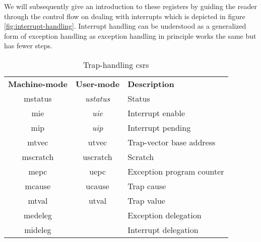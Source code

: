 We will subsequently give an introduction to these registers by guiding the reader through the control flow on dealing with interrupts which is depicted in figure \ref{fig:interrupt-handling}.
Interrupt handling can be understood as a generalized form of exception handling as exception handling in principle works the same but has fewer steps.

\begin{table}
    \centering
    \begin{tabular}{| c c || l |}
        \hline
        \textbf{Machine-mode} & \textbf{User-mode} & \textbf{Description} \\
        \acrshort{mstatus} & \textit{\acrshort{ustatus}} & Status \\
        \acrshort{mie} & \textit{\acrshort{uie}} & Interrupt enable \\
        \acrshort{mip} & \textit{\acrshort{uip}} & Interrupt pending \\
        \acrshort{mtvec} & \acrshort{utvec} & Trap-vector base address \\
        \acrshort{mscratch} & \acrshort{uscratch} & Scratch \\
        \acrshort{mepc} & \acrshort{uepc} & Exception program counter \\
        \acrshort{mcause} & \acrshort{ucause} & Trap cause \\
        \acrshort{mtval} & \acrshort{utval} & Trap value \\
        \acrshort{medeleg} & & Exception delegation \\
        \acrshort{mideleg} & & Interrupt delegation \\
        \hline
    \end{tabular}
    \caption{Trap-handling \glspl{csr}}
    \label{tbl:trap-csrs}
\end{table}

